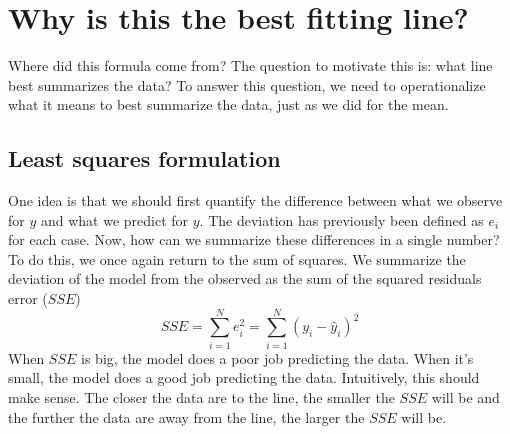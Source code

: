 \section{Why is this the best fitting line?}
Where did this formula come from? The question to motivate this is: what line best summarizes the data? To answer this question, we need to operationalize what it means to best summarize the data, just as we did for the mean.

\subsection{Least squares formulation}

One idea is that we should first quantify the difference between what we observe for $y$ and what we predict for $y$. The deviation has previously been defined as $e_i$ for each case. Now, how can we summarize these differences in a single number? To do this, we once again return to the sum of squares. We summarize the deviation of the model from the observed as the sum of the squared residuals error ($SSE$)
\begin{equation}
SSE=\sum_{i=1}^Ne_i^2=\sum_{i=1}^N\left(y_i-\hat{y}_i\right)^2
\end{equation}
When $SSE$ is big, the model does a poor job predicting the data. When it's small, the model does a good job predicting the data. Intuitively, this should make sense. The closer the data are to the line, the smaller the $SSE$ will be and the further the data are away from the line, the larger the $SSE$ will be.

